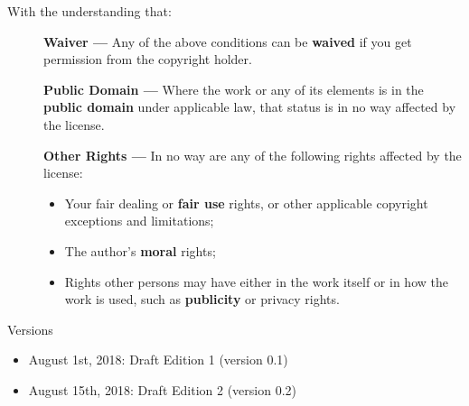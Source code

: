 \documentclass[12pt]{book}
\begin{document}
\vspace{.5cm}
\noindent
With the understanding that:
\begin{description}
\item[] \textbf{Waiver —} Any of the above conditions can be \textbf{waived} if you get permission from the copyright holder.

\item[] \textbf{Public Domain —} Where the work or any of its elements is in the \textbf{public domain} under applicable law, that status is in no way affected by the license.

\item[] \textbf{Other Rights —} In no way are any of the following rights affected by the license:
\begin{itemize}
\item Your fair dealing or \textbf{fair use} rights, or other applicable copyright exceptions and limitations;
\item The author's \textbf{moral} rights;
\item Rights other persons may have either in the work itself or in how the work is used, such as \textbf{publicity} or privacy rights.
\end{itemize}
\end{description}
\normalsize

\newpage

{\LARGE Versions}

\noindent
\begin{itemize}
	\item August 1st, 2018: \hspace{2cm} Draft Edition 1 (version 0.1)
	\item August 15th, 2018: \hspace{2cm} Draft Edition 2 (version 0.2)
\end{itemize}


\ifx\wholebook\relax\else
% 
% 
	
\end{document}
